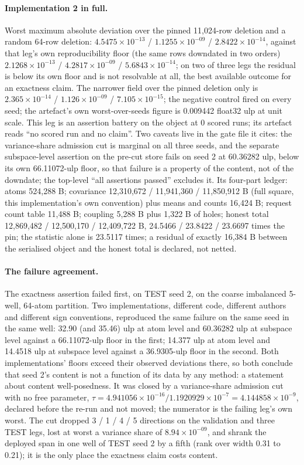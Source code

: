 \documentclass{article}
\newcommand{\sci}[2]{\ensuremath{#1\times10^{#2}}}
\begin{document}
\paragraph{Implementation 2 in full.} Worst maximum absolute deviation over the pinned 11,024-row
deletion and a random 64-row deletion: \sci{4.5475}{-13} / \sci{1.1255}{-09} / \sci{2.8422}{-14},
against that leg's own reproducibility floor (the same rows downdated in two orders)
\sci{2.1268}{-13} / \sci{4.2817}{-09} / \sci{5.6843}{-14}; on two of three legs the residual is below
its own floor and is not resolvable at all, the best available outcome for an exactness claim. The
narrower field over the pinned deletion only is \sci{2.365}{-14} / \sci{1.126}{-09} /
\sci{7.105}{-15}; the negative control fired on every seed; the artefact's own worst-over-seeds
figure is 0.009442 float32 ulp at unit scale.
This leg is an assertion battery on the object at 0 scored runs; its artefact reads ``no scored run
and no claim''. Two caveats live in the gate file it cites: the variance-share admission cut is
marginal on all three seeds, and the separate subspace-level assertion on the pre-cut store fails on
seed 2 at 60.36282 ulp, below its own 66.11072-ulp floor, so that failure is a property of the
content, not of the downdate; the top-level ``all assertions passed'' excludes it.
Its four-part ledger: atoms 524,288 B; covariance 12,310,672 / 11,941,360 / 11,850,912 B (full
square, this implementation's own convention) plus means and counts 16,424 B; request count table
11,488 B; coupling 5,288 B plus 1,322 B of holes; honest total 12,869,482 / 12,500,170 / 12,409,722
B, 24.5466 / 23.8422 / 23.6697 times the pin; the statistic alone is 23.5117 times; a residual of
exactly 16,384 B between the serialised object and the honest total is declared, not netted.

\paragraph{The failure agreement.} The exactness assertion failed first, on TEST seed 2, on the
coarse imbalanced 5-well, 64-atom partition. Two implementations, different code, different
authors and different sign conventions, reproduced the same failure on the same seed in the same
well: 32.90 (and 35.46) ulp at atom level and 60.36282 ulp at subspace level against a 66.11072-ulp
floor in the first; 14.377 ulp at atom level and 14.4518 ulp at subspace level against a
36.9305-ulp floor in the second. Both implementations' floors exceed their observed deviations
there, so both conclude that seed 2's content is not a function of its data by any method: a
statement about content well-posedness. It was closed by a variance-share admission cut with no
free parameter, $\tau=4.941056\times10^{-16}/1.1920929\times10^{-7}=4.144858\times10^{-9}$, declared
before the re-run and not moved; the numerator is the failing leg's own worst.
The cut dropped 3 / 1 / 4 / 5 directions on the validation and three TEST legs, lost at worst a
variance share of \sci{8.94}{-09}, and shrank the deployed span in one well of TEST seed 2 by a fifth
(rank over width 0.31 to 0.21); it is the only place the exactness claim costs content.
\end{document}
